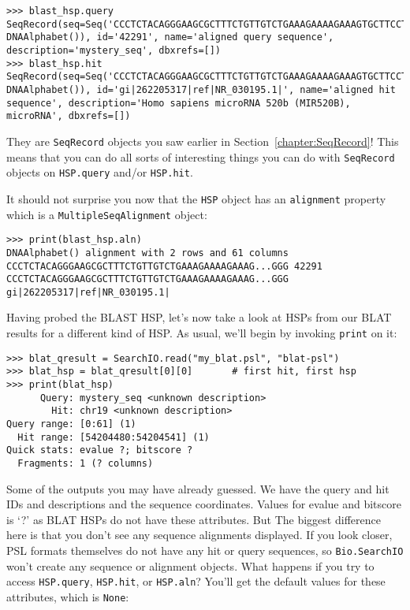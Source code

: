 \begin{verbatim}
>>> blast_hsp.query
SeqRecord(seq=Seq('CCCTCTACAGGGAAGCGCTTTCTGTTGTCTGAAAGAAAAGAAAGTGCTTCCTTT...GGG', DNAAlphabet()), id='42291', name='aligned query sequence', description='mystery_seq', dbxrefs=[])
>>> blast_hsp.hit
SeqRecord(seq=Seq('CCCTCTACAGGGAAGCGCTTTCTGTTGTCTGAAAGAAAAGAAAGTGCTTCCTTT...GGG', DNAAlphabet()), id='gi|262205317|ref|NR_030195.1|', name='aligned hit sequence', description='Homo sapiens microRNA 520b (MIR520B), microRNA', dbxrefs=[])
\end{verbatim}

They are \verb|SeqRecord| objects you saw earlier in
Section~\ref{chapter:SeqRecord}! This means that you can do all sorts of
interesting things you can do with \verb|SeqRecord| objects on \verb|HSP.query|
and/or \verb|HSP.hit|.

It should not surprise you now that the \verb|HSP| object has an
\verb|alignment| property which is a \verb|MultipleSeqAlignment| object:

\begin{verbatim}
>>> print(blast_hsp.aln)
DNAAlphabet() alignment with 2 rows and 61 columns
CCCTCTACAGGGAAGCGCTTTCTGTTGTCTGAAAGAAAAGAAAG...GGG 42291
CCCTCTACAGGGAAGCGCTTTCTGTTGTCTGAAAGAAAAGAAAG...GGG gi|262205317|ref|NR_030195.1|
\end{verbatim}

Having probed the BLAST HSP, let's now take a look at HSPs from our BLAT
results for a different kind of HSP. As usual, we'll begin by invoking
\verb|print| on it:

\begin{verbatim}
>>> blat_qresult = SearchIO.read("my_blat.psl", "blat-psl")
>>> blat_hsp = blat_qresult[0][0]       # first hit, first hsp
>>> print(blat_hsp)
      Query: mystery_seq <unknown description>
        Hit: chr19 <unknown description>
Query range: [0:61] (1)
  Hit range: [54204480:54204541] (1)
Quick stats: evalue ?; bitscore ?
  Fragments: 1 (? columns)
\end{verbatim}

Some of the outputs you may have already guessed. We have the query and hit IDs
and descriptions and the sequence coordinates. Values for evalue and bitscore is
`?' as BLAT HSPs do not have these attributes. But The biggest difference here
is that you don't see any sequence alignments displayed. If you look closer, PSL
formats themselves do not have any hit or query sequences, so
\verb|Bio.SearchIO| won't create any sequence or alignment objects. What happens
if you try to access \verb|HSP.query|, \verb|HSP.hit|, or \verb|HSP.aln|?
You'll get the default values for these attributes, which is \verb|None|:


